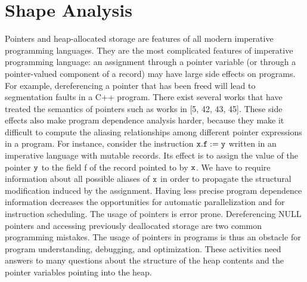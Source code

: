 \chapter{Shape Analysis}
Pointers and heap-allocated storage are features of all modern imperative programming languages.
They are the most complicated features of imperative programming language:
an assignment through a
pointer variable (or through a pointer-valued component  of a record) may have large side effects on programs.
For example, dereferencing a pointer that has been freed will lead to segmentation faults  in a C++ program.
There exist several works that have treated the semantics of pointers such as works in [5, 42, 43, 45].
These side effects also make program dependence  analysis harder, because they make it
difficult to compute the aliasing relationships among different pointer expressions in a program.
For instance, consider the instruction $\tt x.f := y$ written in an imperative language with mutable records.
Its effect is to assign the value of the pointer $\tt y$ to the  field f of the record pointed to by $\tt x$. We have to require information about all possible aliases of $\tt x$ in order to propagate the structural modification induced by the assignment.
Having less precise program dependence information
decreases the opportunities for automatic parallelization
and for instruction scheduling. The usage of pointers is error prone.
Dereferencing NULL pointers and accessing previously deallocated storage are two common programming mistakes. The usage of pointers in programs is thus an obstacle for
program understanding, debugging, and optimization. These activities need answers to many questions
about the structure of the heap contents and the pointer variables pointing into the heap. 

